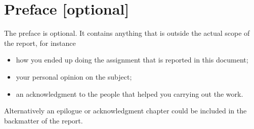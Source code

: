 \chapter{Preface [optional]}
\pagestyle{headings}

The preface is optional. It contains anything that is outside the actual scope of the report, for instance
\begin{itemize}
	\item how you ended up doing the assignment that is reported in this document;
	\item your personal opinion on the subject;
	\item an acknowledgment to the people that helped you carrying out the work.
\end{itemize}
Alternatively an epilogue or acknowledgment chapter could be included in the backmatter of the report.